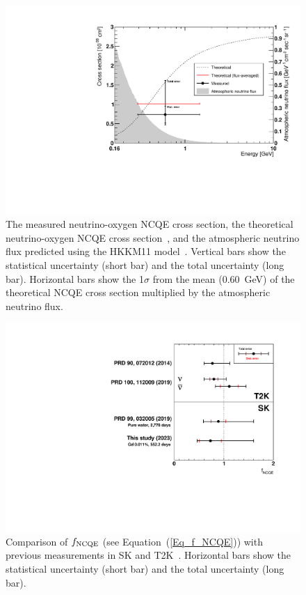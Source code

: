 \begin{figure}[p]
	\centering
	\includegraphics[width=12cm]{PDF/CrossSection/Logx_Figure09}
	\caption[The measured neutrino-oxygen NCQE cross section, the theoretical neutrino-oxygen NCQE cross section, and the atmospheric neutrino flux predicted using the HKKM11 model]{
	The measured neutrino-oxygen NCQE cross section, the theoretical neutrino-oxygen NCQE cross section~\cite{2012Ankowski}, and the atmospheric neutrino flux predicted using the HKKM11 model~\cite{2011Honda}.
	Vertical bars show the statistical uncertainty (short bar) and the total uncertainty (long bar).
	Horizontal bars show the 1$\sigma$ from the mean (0.60~GeV) of the theoretical NCQE cross section multiplied by the atmospheric neutrino flux.
	}\label{Logx_Figure09}
\end{figure}

\begin{figure}[p]
	\centering
	\includegraphics[width=12cm]{PDF/PreviousStudy/PreviousStudy}
	\caption[Comparison of $f_{\rm NCQE}$ with previous measurements in SK and T2K]{
	Comparison of $f_{\rm NCQE}$ (see Equation~(\ref{Eq_f_NCQE})) with previous measurements in SK and T2K~\cite{2014Abe,2019Abe,2019Linyan}.
	Horizontal bars show the statistical uncertainty (short bar) and the total uncertainty (long bar).
	}\label{PreviousStudy}
\end{figure}

